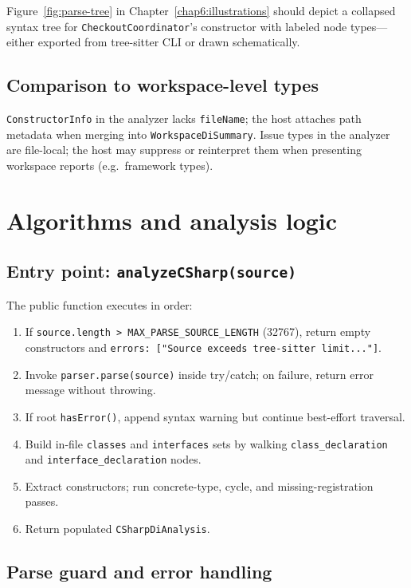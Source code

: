Figure~\ref{fig:parse-tree} in Chapter~\ref{chap6:illustrations} should depict a collapsed syntax tree for \texttt{CheckoutCoordinator}'s constructor with labeled node types---either exported from tree-sitter CLI or drawn schematically.

\subsection{Comparison to workspace-level types}

\texttt{ConstructorInfo} in the analyzer lacks \texttt{fileName}; the host attaches path metadata when merging into \texttt{WorkspaceDiSummary}. Issue types in the analyzer are file-local; the host may suppress or reinterpret them when presenting workspace reports (e.g.\ framework types).

\section{Algorithms and analysis logic}
\label{chap3:algorithms}

\subsection{Entry point: \texttt{analyzeCSharp(source)}}

The public function executes in order:
\begin{enumerate}
	\item If \texttt{source.length > MAX\_PARSE\_SOURCE\_LENGTH} (32767), return empty constructors and \texttt{errors: ["Source exceeds tree-sitter limit..."]}.
	\item Invoke \texttt{parser.parse(source)} inside try/catch; on failure, return error message without throwing.
	\item If root \texttt{hasError()}, append syntax warning but continue best-effort traversal.
	\item Build in-file \texttt{classes} and \texttt{interfaces} sets by walking \texttt{class\_declaration} and \texttt{interface\_declaration} nodes.
	\item Extract constructors; run concrete-type, cycle, and missing-registration passes.
	\item Return populated \texttt{CSharpDiAnalysis}.
\end{enumerate}

\subsection{Parse guard and error handling}

